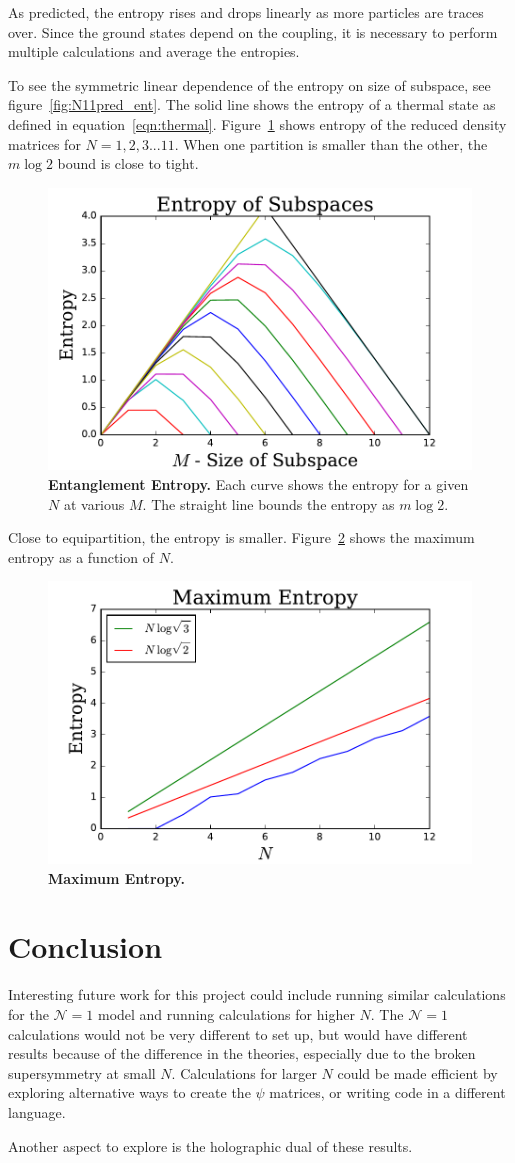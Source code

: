 \documentclass[12pt]{article} %
\renewcommand{\cal}{\mathcal}
\begin{document}
As predicted, the entropy rises and drops linearly as more particles are traces over. Since the ground states depend on the coupling, it is necessary to perform multiple calculations and average the entropies. 

To see the symmetric linear dependence of the entropy on size of subspace, see figure~\ref{fig:N11pred_ent}. The solid line shows the entropy of a thermal state as defined in equation~\ref{eqn:thermal}. Figure~\ref{fig:allentropy} shows entropy of the reduced density matrices for $N = 1,2,3...11$. When one partition is smaller than the other, the $m\log2$ bound is close to tight. 

\begin{figure}
	\centering
	\includegraphics[width=.5\textwidth]{allentropy}
	\caption{\textbf{Entanglement Entropy.} Each curve shows the entropy for a given $N$ at various $M$. The straight line bounds the entropy as $m\log2$.}
	\label{fig:allentropy}
\end{figure}

Close to equipartition, the entropy is smaller. Figure~\ref{fig:maxentropy} shows the maximum entropy as a function of $N$.

\begin{figure}
	\centering
	\includegraphics[width=.5\textwidth]{maxentropy}
	\caption{\textbf{Maximum Entropy.} }
	\label{fig:maxentropy}
\end{figure}

\section{Conclusion} \label{sec:concl}

Interesting future work for this project could include running similar calculations for the $\cal N=1$ model and running calculations for higher $N$. The $\cal N=1$ calculations would not be very different to set up, but would have different results because of the difference in the theories, especially due to the broken supersymmetry at small $N$. Calculations for larger $N$ could be made efficient by exploring alternative ways to create the $\psi$ matrices, or writing code in a different language.

Another aspect to explore is the holographic dual of these results.

\printbibliography
\end{document}

